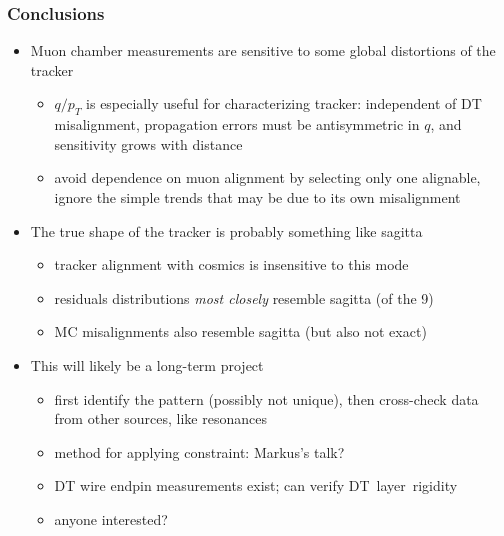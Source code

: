 \documentclass[compress]{beamer}
\begin{document}

\begin{frame}
\frametitle{Conclusions}
\begin{itemize}
\item<1-> Muon chamber measurements are sensitive to some global distortions of the tracker
\begin{itemize}
\item $q/p_T$ is especially useful for characterizing tracker:
  independent of DT misalignment, propagation errors must be
  antisymmetric in $q$, and sensitivity grows with distance
\item avoid dependence on muon alignment by selecting only one
  alignable, ignore the simple trends that may be due to its own
  misalignment
\end{itemize}

\item<2-> The true shape of the tracker is probably something like sagitta
\begin{itemize}
\item tracker alignment with cosmics is insensitive to this mode
\item residuals distributions {\it most closely} resemble sagitta (of the 9)
\item MC misalignments also resemble sagitta (but also not exact)
\end{itemize}

\item<3-> This will likely be a long-term project
\begin{itemize}
\item first identify the pattern (possibly not unique), then cross-check data from other sources, like resonances
\item method for applying constraint: Markus's talk?
\item DT wire endpin measurements exist; can verify \mbox{DT layer rigidity\hspace{-1 cm}}
\item anyone interested?
\end{itemize}
\end{itemize}
\label{numpages}
\end{frame}
\end{document}
